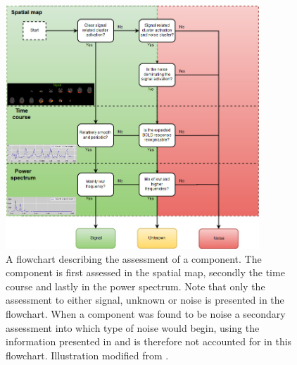  \begin{figure}[H]                 
 	\includegraphics[width=0.85\textwidth]{figures/bMethods/Hand_labeling}  
 	\caption{A flowchart describing the assessment of a component. The component is first assessed in the spatial map, secondly the time course and lastly in the power spectrum. Note that only the assessment to either signal, unknown or noise is presented in the flowchart. When a component was found to be noise a secondary assessment into which type of noise would begin, using the information presented in \cite{Salimi-Khorshidi2014,Griffanti2017} and is therefore not accounted for in this flowchart. Illustration modified from \cite{Griffanti2017}.}
 	\label{fig:hand_label} 
 \end{figure}
